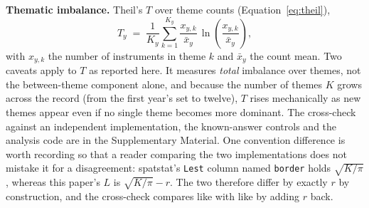 \documentclass[fleqn,10pt,lineno]{wlpeerj}
\begin{document}
\noindent\textbf{Thematic imbalance.} Theil's $T$ \citep{theil1967economics,barabesi2026theil}
over theme counts (Equation~\eqref{eq:theil}),
\begin{equation}
T_y \;=\; \frac{1}{K_y}\sum_{k=1}^{K_y} \frac{x_{y,k}}{\bar{x}_y}\,
\ln\!\left(\frac{x_{y,k}}{\bar{x}_y}\right),
\label{eq:theil}
\end{equation}
with $x_{y,k}$ the number of instruments in theme $k$ and $\bar{x}_y$ the count mean.
Two caveats apply to $T$ as
reported here. It measures \emph{total} imbalance over themes, not the between-theme
component alone, and because the number of themes $K$ grows across the record (from
the first year's set to twelve), $T$ rises mechanically as new themes appear even if
no single theme becomes more dominant. The cross-check against an independent
implementation, the known-answer controls and the analysis code are in the Supplementary
Material. One convention difference is worth recording so that a reader comparing the two
implementations does not mistake it for a disagreement: \textsf{spatstat}'s \texttt{Lest}
column named \texttt{border} holds $\sqrt{K/\pi}$, whereas this paper's $L$ is
$\sqrt{K/\pi} - r$. The two therefore differ by exactly $r$ by construction, and the
cross-check compares like with like by adding $r$ back.
\end{document}
